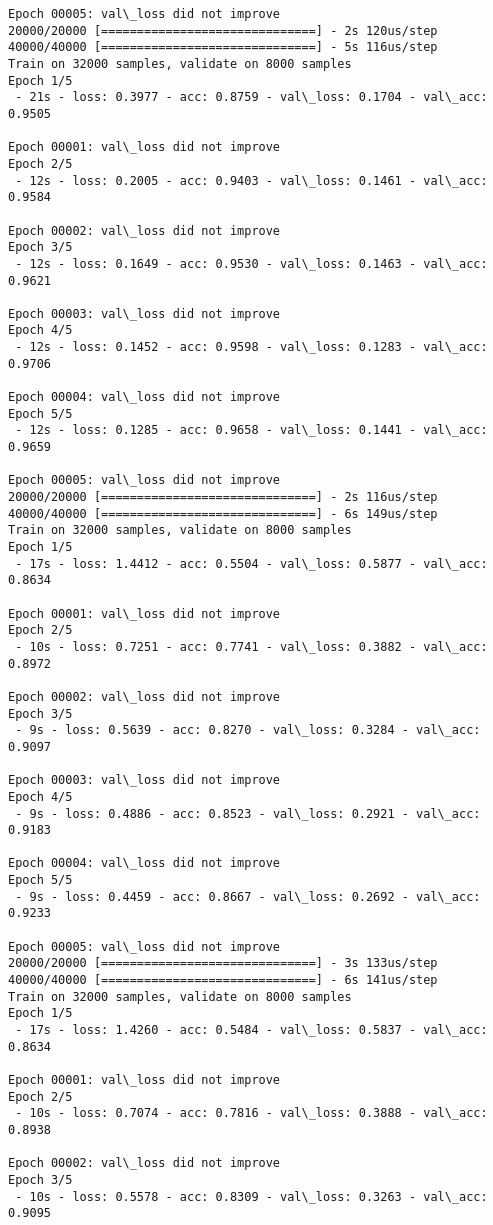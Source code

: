\documentclass[11pt]{article}
\begin{document}
\begin{Verbatim}[commandchars=\\\{\}]
Epoch 00005: val\_loss did not improve
20000/20000 [==============================] - 2s 120us/step
40000/40000 [==============================] - 5s 116us/step
Train on 32000 samples, validate on 8000 samples
Epoch 1/5
 - 21s - loss: 0.3977 - acc: 0.8759 - val\_loss: 0.1704 - val\_acc: 0.9505

Epoch 00001: val\_loss did not improve
Epoch 2/5
 - 12s - loss: 0.2005 - acc: 0.9403 - val\_loss: 0.1461 - val\_acc: 0.9584

Epoch 00002: val\_loss did not improve
Epoch 3/5
 - 12s - loss: 0.1649 - acc: 0.9530 - val\_loss: 0.1463 - val\_acc: 0.9621

Epoch 00003: val\_loss did not improve
Epoch 4/5
 - 12s - loss: 0.1452 - acc: 0.9598 - val\_loss: 0.1283 - val\_acc: 0.9706

Epoch 00004: val\_loss did not improve
Epoch 5/5
 - 12s - loss: 0.1285 - acc: 0.9658 - val\_loss: 0.1441 - val\_acc: 0.9659

Epoch 00005: val\_loss did not improve
20000/20000 [==============================] - 2s 116us/step
40000/40000 [==============================] - 6s 149us/step
Train on 32000 samples, validate on 8000 samples
Epoch 1/5
 - 17s - loss: 1.4412 - acc: 0.5504 - val\_loss: 0.5877 - val\_acc: 0.8634

Epoch 00001: val\_loss did not improve
Epoch 2/5
 - 10s - loss: 0.7251 - acc: 0.7741 - val\_loss: 0.3882 - val\_acc: 0.8972

Epoch 00002: val\_loss did not improve
Epoch 3/5
 - 9s - loss: 0.5639 - acc: 0.8270 - val\_loss: 0.3284 - val\_acc: 0.9097

Epoch 00003: val\_loss did not improve
Epoch 4/5
 - 9s - loss: 0.4886 - acc: 0.8523 - val\_loss: 0.2921 - val\_acc: 0.9183

Epoch 00004: val\_loss did not improve
Epoch 5/5
 - 9s - loss: 0.4459 - acc: 0.8667 - val\_loss: 0.2692 - val\_acc: 0.9233

Epoch 00005: val\_loss did not improve
20000/20000 [==============================] - 3s 133us/step
40000/40000 [==============================] - 6s 141us/step
Train on 32000 samples, validate on 8000 samples
Epoch 1/5
 - 17s - loss: 1.4260 - acc: 0.5484 - val\_loss: 0.5837 - val\_acc: 0.8634

Epoch 00001: val\_loss did not improve
Epoch 2/5
 - 10s - loss: 0.7074 - acc: 0.7816 - val\_loss: 0.3888 - val\_acc: 0.8938

Epoch 00002: val\_loss did not improve
Epoch 3/5
 - 10s - loss: 0.5578 - acc: 0.8309 - val\_loss: 0.3263 - val\_acc: 0.9095


\end{Verbatim}
\end{document}

